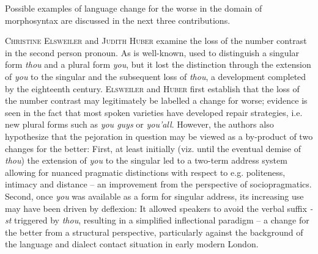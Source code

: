 \documentclass[output=paper,colorlinks,citecolor=brown]{langscibook}
\begin{document}
Possible examples of language change for the worse in the domain of morphosyntax are discussed in the next three contributions.

\textsc{Christine Elsweiler} and \textsc{Judith Huber} examine the loss of the number contrast in the  second person pronoun. As is well-known,  used to distinguish a singular form \textit{thou} and a plural form \textit{you}, but it lost the distinction through the extension of \textit{you} to the singular and the subsequent loss of \textit{thou}, a development completed by the eighteenth century. \textsc{Elsweiler} and \textsc{Huber} first establish that the loss of the number contrast may legitimately be labelled a change for worse; evidence is seen in the fact that most spoken varieties have developed repair strategies, i.e. new plural forms such as \textit{you guys} or \textit{you'all}. However, the authors also hypothesize that the pejoration in question may be viewed as a by-product of two changes for the better: First, at least initially (viz. until the eventual demise of \textit{thou})  the extension of \textit{you} to the singular led to a two-term address system allowing for nuanced pragmatic distinctions with respect to e.g. politeness, intimacy and distance -- an improvement from the perspective of sociopragmatics. Second, once \textit{you} was available as a form for singular address, its increasing use may have been driven by deflexion: It allowed speakers to avoid the verbal suffix \textit{-st} triggered by \textit{thou}, resulting in a simplified inflectional paradigm --  a change for the better from a structural perspective, particularly against the background of the language and dialect contact situation in early modern London.
\end{document}
